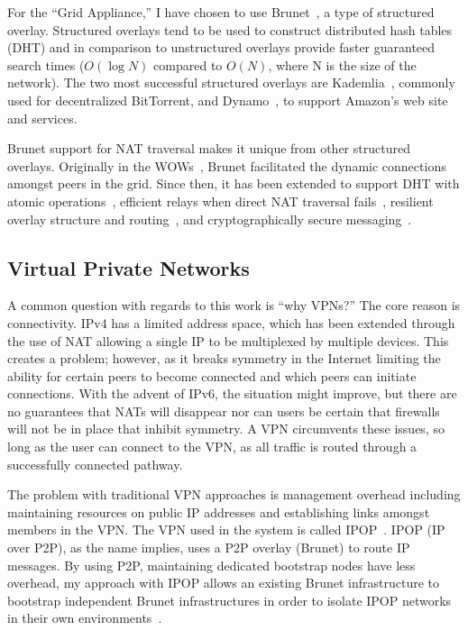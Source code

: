 For the ``Grid Appliance,'' I have chosen to use Brunet~\cite{brunet}, a type of
structured overlay.  Structured overlays tend to be used to construct
distributed hash tables (DHT) and in comparison to unstructured overlays
provide faster guaranteed search times ($O(\log N)$ compared to $O(N)$, where N
is the size of the network).  The two most successful structured overlays are
Kademlia~\cite{kademlia}, commonly used for decentralized BitTorrent, and
Dynamo~\cite{dynamo}, to support Amazon's web site and services.

Brunet support for NAT traversal makes it unique from other structured
overlays.  Originally in the WOWs~\cite{wow}, Brunet facilitated the dynamic
connections amongst peers in the grid.  Since then, it has been extended to
support DHT with atomic operations~\cite{pcgrid07}, efficient relays when
direct NAT traversal fails~\cite{groupvpn}, resilient overlay structure and
routing~\cite{hpdc08_0}, and cryptographically secure
messaging~\cite{groupvpn}.

\subsection{Virtual Private Networks}

A common question with regards to this work is ``why VPNs?''  The core reason
is connectivity.  IPv4 has a limited address space, which has been extended
through the use of NAT allowing a single IP to be multiplexed by multiple
devices.  This creates a problem; however, as it breaks symmetry in the
Internet limiting the ability for certain peers to become connected and which
peers can initiate connections.  With the advent of IPv6, the situation might
improve, but there are no guarantees that NATs will disappear nor can users be
certain that firewalls will not be in place that inhibit symmetry.  A VPN
circumvents these issues, so long as the user can connect to the VPN, as all
traffic is routed through a successfully connected pathway.

The problem with traditional VPN approaches is management overhead including
maintaining resources on public IP addresses and establishing links amongst
members in the VPN.  The VPN used in the system is called IPOP~\cite{groupvpn,
ipop}.  IPOP (IP over P2P), as the name implies, uses a P2P overlay (Brunet) to
route IP messages.  By using P2P, maintaining dedicated bootstrap nodes have
less overhead, my approach with IPOP allows an existing Brunet infrastructure
to bootstrap independent Brunet infrastructures in order to isolate IPOP
networks in their own environments~\cite{bootstrapping}.

